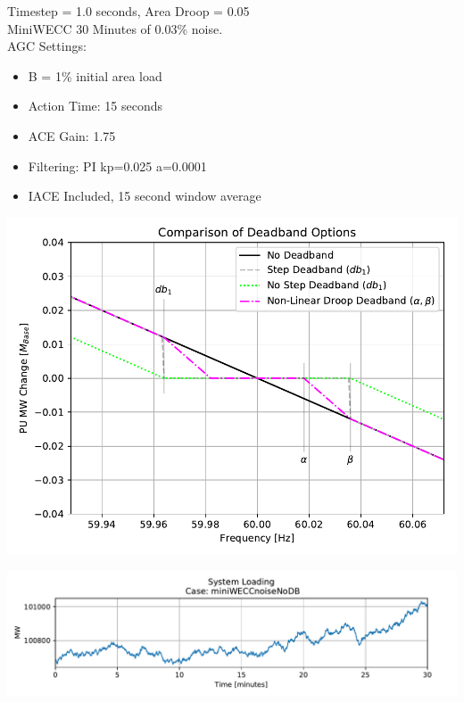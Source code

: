 \documentclass[12pt]{article}
\newcommand{\caseName}{changeme}
\begin{document}
\begin{minipage}{.5\linewidth}
Timestep = 1.0 seconds, Area Droop = 0.05\\
MiniWECC 30 Minutes of 0.03\% noise. \\

AGC Settings:
\begin{itemize}
\item B = 1\% initial area load
\item Action Time: 15 seconds
\item ACE Gain: 1.75
\item Filtering: PI kp=0.025 a=0.0001
\item IACE Included, 15 second window average
\end{itemize}
\end{minipage}%
\begin{minipage}{.5\linewidth}
\includegraphics[width=\linewidth]{dbAction3}
\end{minipage}%


\includegraphics[width=\linewidth]{miniWECCnoiseNoDBPload}\\


\pagebreak

\renewcommand{\caseName}{miniWECCnoiseNoDB}
\end{document}
